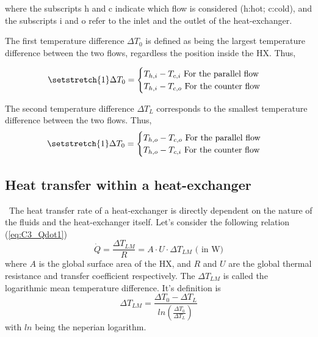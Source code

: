 where the subscripts h and c indicate which flow is considered (h:hot; c:cold), and the subscripts i and o refer to the inlet and the outlet of the heat-exchanger.

The first temperature difference \(\Delta T_0\) is defined as being the largest temperature difference between the two flows, regardless the position inside the HX. Thus,

\begin{equation}
    \setstretch{1}
    \Delta T_0 =
    \begin{cases}
        T_{h,i} - T_{c,i} \text{ For the parallel flow} \\
        T_{h,i} - T_{c,o} \text{ For the counter flow}  \\
    \end{cases}\label{eq:C3_DT0}
\end{equation}

The second temperature difference \(\Delta T_L\) corresponds to the smallest temperature difference between the two flows. Thus,
\begin{equation}
    \setstretch{1}
    \Delta T_0 =
    \begin{cases}
        T_{h,o} - T_{c,o} \text{ For the parallel flow} \\
        T_{h,o} - T_{c,i} \text{ For the counter flow}  \\
    \end{cases}\label{eq:C3_DTL}
\end{equation}

\subsection{Heat transfer within a heat-exchanger}
\quad\ The heat transfer rate of a heat-exchanger is directly dependent on the nature of the fluids and the heat-exchanger itself. Let's consider the following relation (\ref{eq:C3_Qdot1})
\begin{equation}
    \dot{Q} = \frac{\Delta T_{LM}}{R}= A\cdot U\cdot \Delta T_{LM}\text{ ( in W)}\label{eq:C3_Qdot1}
\end{equation}
where \(A\) is the global surface area of the HX, and \(R\) and \(U\) are the global thermal resistance and transfer coefficient respectively. The \(\Delta T_{LM}\) is called the logarithmic mean temperature difference. It's definition is
\begin{equation}
    \Delta T_{LM} = \frac{\Delta T_0-\Delta T_L}{ln\left(\frac{\Delta T_0}{\Delta T_L}\right)}\label{eq:C3_lmtd}
\end{equation}
with \(ln\) being the neperian logarithm.
